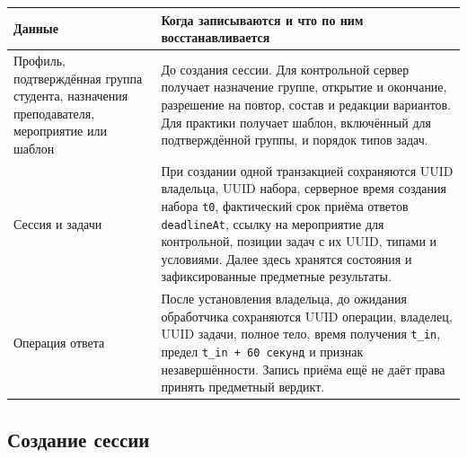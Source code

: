 \documentclass[12pt,a4paper]{article}
\begin{document}
{\def\LTcaptype{none} %
\begin{longtable}[]{@{}
  >{\raggedright\arraybackslash}p{}
  >{\raggedright\arraybackslash}p{}@{}}
\toprule\noalign{}
\begin{minipage}[b]{\linewidth}\raggedright
Данные
\end{minipage} & \begin{minipage}[b]{\linewidth}\raggedright
Когда записываются и что по ним восстанавливается
\end{minipage} \\
\midrule\noalign{}
\endhead
\bottomrule\noalign{}
\endlastfoot
Профиль, подтверждённая группа студента, назначения преподавателя, мероприятие или шаблон & До создания сессии. Для контрольной сервер получает назначение группе, открытие и окончание, разрешение на повтор, состав и редакции вариантов. Для практики получает шаблон, включённый для подтверждённой группы, и порядок типов задач. \\
Сессия и задачи & При создании одной транзакцией сохраняются UUID владельца, UUID набора, серверное время создания набора \texttt{t0}, фактический срок приёма ответов \texttt{deadlineAt}, ссылку на мероприятие для контрольной, позиции задач с их UUID, типами и условиями. Далее здесь хранятся состояния и зафиксированные предметные результаты. \\
Операция ответа & После установления владельца, до ожидания обработчика сохраняются UUID операции, владелец, UUID задачи, полное тело, время получения \texttt{t\_in}, предел \texttt{t\_\allowbreak{}in + 60 секунд} и признак незавершённости. Запись приёма ещё не даёт права принять предметный вердикт. \\
\end{longtable}
}

\subsection{Создание сессии}\label{ux441ux43eux437ux434ux430ux43dux438ux435-ux441ux435ux441ux441ux438ux438}

\hypertarget{создание-сессии}{}
\end{document}
